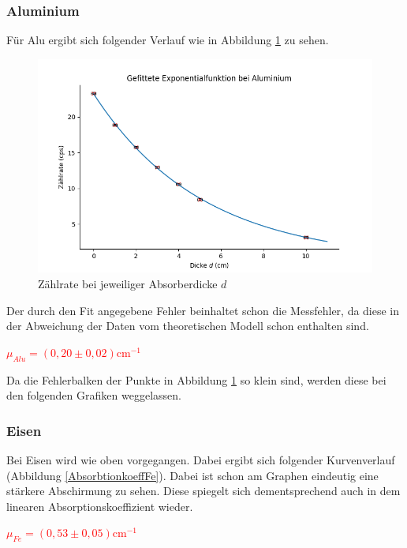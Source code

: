\subsubsection*{Aluminium}

Für Alu ergibt sich folgender Verlauf wie in Abbildung \ref{AbsorbtionkoeffAlu} zu sehen.\\

\begin{figure}[ht]
    \centering
    \includegraphics[width = \linewidth]{Bilder/Auswertung/AbsorbtioskAlu.png}
    \caption{Zählrate bei jeweiliger Absorberdicke $d$}
    \label{AbsorbtionkoeffAlu}
\end{figure}

 
Der durch den Fit angegebene Fehler beinhaltet schon die Messfehler, da diese in der Abweichung der Daten vom theoretischen Modell 
schon enthalten sind.
\begin{center}
    \centering
    \textcolor{red}{$\mu_{Alu}= (0,20 \pm 0,02) \mathrm{cm}^{-1}$}
\end{center}

Da die Fehlerbalken der Punkte in Abbildung \ref{AbsorbtionkoeffAlu} so klein sind, werden diese bei den folgenden Grafiken weggelassen. 
\subsubsection*{Eisen}
Bei Eisen wird wie oben vorgegangen. Dabei ergibt sich folgender Kurvenverlauf (Abbildung \ref{AbsorbtionkoeffFe}). Dabei ist schon am Graphen eindeutig eine stärkere Abschirmung zu sehen. Diese spiegelt sich dementsprechend 
auch in dem linearen Absorptionskoeffizient wieder.


\begin{center}
    \centering
    \textcolor{red}{$\mu_{Fe}= (0,53 \pm 0,05) \mathrm{cm}^{-1}$}
\end{center}

